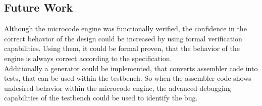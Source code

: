 \subsection{Future Work}

Although the microcode engine was functionally verified, the confidence in the correct behavior of the design could be increased by using formal verification
capabilities. Using them, it could be formal proven, that the behavior of the engine is always correct according to the specification. \\
Additionally a generator could be implemented, that converts assembler code into tests, that can be used within the testbench.
So when the assembler code shows undesired behavior within the microcode engine, the advanced debugging capabilities of the testbench could be used to identify
the bug.
